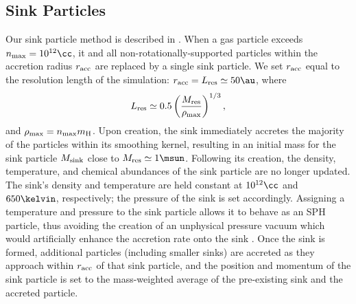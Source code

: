 \subsection{Sink Particles}
\label{sinkParticles}
Our sink particle method is described in \citet{StacyGreifBromm2010}. 
When a gas particle exceeds $n_{\rm max} = 10^{12}\cc$, it and all non-rotationally-supported particles within the accretion radius $r_{\rm acc}$ are replaced by a single sink particle.  
We set $r_{\rm acc}$ equal to the resolution length of the simulation: $r_{\rm acc} = L_{\rm res} \simeq 50\au$, where 
\begin{equation}
L_{\rm res} \simeq 0.5 \left( \frac{M_{\rm res}}{\rho_{\rm max}} \right)^{1/3},
\end{equation}
and $\rho_{\rm max} = n_{\rm max} m_{\rm H}$.  
Upon creation, the sink immediately accretes the majority of the particles within its smoothing kernel, resulting in an initial mass for the sink particle $M_{\rm sink}$ close to $M_{\rm res} \simeq 1\msun$.  
Following its creation, the density, temperature, and chemical abundances of the sink particle are no longer updated.  
The sink's density and temperature are held constant at $10^{12}\cc$ and $650\kelvin$, respectively; the pressure of the sink is set accordingly. 
Assigning a temperature and pressure to the sink particle allows it to behave as an SPH particle, thus avoiding the creation of an unphysical pressure vacuum which would artificially enhance the accretion rate onto the sink \citep[see][]{BrommCoppiLarson2002, MartelEvansShapiro2006}. 
Once the sink is formed, additional particles (including smaller sinks) are accreted as they approach within $r_{\rm acc}$ of that sink particle, and the position and momentum of the sink particle is set to the mass-weighted average of the pre-existing sink and the accreted particle.